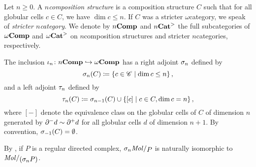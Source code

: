 \begin{dfn} 
    Let \( n \geq 0 \).
    A \emph{\( n \)\nbd composition structure} is a composition structure \( C \) such that for all globular cells \( c \in C \), we have \( \dim c \le n \).
    If \( C \) was a stricter \( \omega \)\nbd category, we speak of \emph{stricter \( n \)\nbd category}.
    We denote by \( {n\mathbf{Comp}} \) and \( {n\mathbf{Cat}}^> \) the full subcategories of \( \omega\mathbf{Comp} \) and \( {\omega\mathbf{Cat}}^> \) on \( n \)\nbd composition structures and stricter \( n \)\nbd categories, respectively. 
\end{dfn}

\begin{dfn} 
    The inclusion \( \iota_n \colon {n\mathbf{Comp}} \hookrightarrow \omega\mathbf{Comp} \) has a right adjoint \( \sigma_{n} \) defined by
    \begin{equation*}
        \sigma_{n}(C) \coloneqq \left\{ {c \in \mathscr{C} \mid \dim c \le n} \right\},
    \end{equation*}
    and a left adjoint \( \tau_{n} \) defined by
    \begin{equation*}
        \tau_{n}(C) \coloneqq \sigma_{n - 1}(C) \cup \left\{ {[c] \mid c \in C, \dim c = n} \right\},
    \end{equation*}
    where \( [-] \) denote the equivalence class on the globular cells of \( C \) of dimension \( n \) generated by \( \partial_{}^{-} d \sim \partial_{}^{+} d \) for all globular cells \( d \) of dimension \( n + 1 \). 
    By convention, \( \sigma_{-1}(C) = \emptyset \).
\end{dfn}

\begin{rmk}
    By \cite[Proposition 5.2.14]{hadzihasanovic2024combinatorics}, if \( P \) is a regular directed complex, \( \skel{n} \molecin{P} \) is naturally isomorphic to \( \molecin{(\skel{n}P)} \).
\end{rmk}

